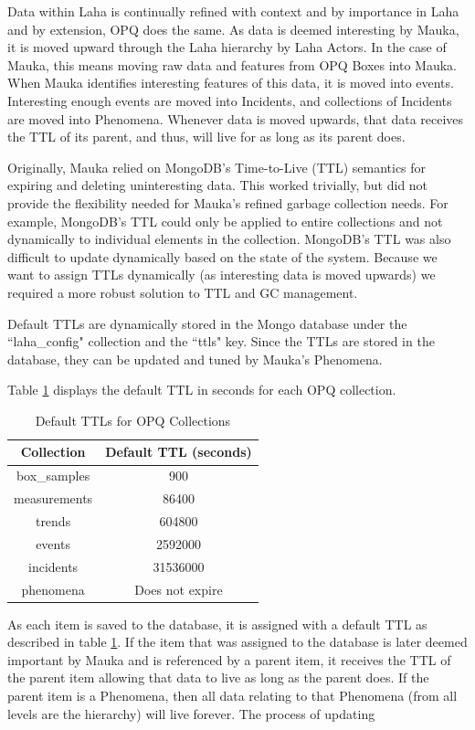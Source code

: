 Data within Laha is continually refined with context and by importance in Laha and by extension, OPQ does the same. As data is deemed interesting by Mauka, it is moved upward through the Laha hierarchy by Laha Actors. In the case of Mauka, this means moving raw data and features from OPQ Boxes into Mauka. When Mauka identifies interesting features of this data, it is moved into events. Interesting enough events are moved into Incidents, and collections of Incidents are moved into Phenomena. Whenever data is moved upwards, that data receives the TTL of its parent, and thus, will live for as long as its parent does.  

Originally, Mauka relied on MongoDB's Time-to-Live (TTL) semantics for expiring and deleting uninteresting data. This worked trivially, but did not provide the flexibility needed for Mauka's refined garbage collection needs. For example, MongoDB's TTL could only be applied to entire collections and not dynamically to individual elements in the collection. MongoDB's TTL was also difficult to update dynamically based on the state of the system. Because we want to assign TTLs dynamically (as interesting data is moved upwards) we required a more robust solution to TTL and GC management.

Default TTLs are dynamically stored in the Mongo database under the ``laha\_config" collection and the ``ttls" key. Since the TTLs are stored in the database, they can be updated and tuned by Mauka's Phenomena.

Table \ref{table:DefaultTtls} displays the default TTL in seconds for each OPQ collection.

\begin{table}[H]
	\centering
	\caption{Default TTLs for OPQ Collections}
	\begin{tabular}{|c|c|}
		\hline 
		Collection & Default TTL (seconds) \\ 
		\hline
		box\_samples & 900 \\
		\hline
		measurements & 86400 \\
		\hline
		trends & 604800 \\
		\hline
		events & 2592000 \\
		\hline
		incidents & 31536000 \\
		\hline 
		phenomena & Does not expire \\
		\hline
	\end{tabular} 
	\label{table:DefaultTtls}
\end{table}

As each item is saved to the database, it is assigned with a default TTL as described in table \ref{table:DefaultTtls}. If the item that was assigned to the database is later deemed important by Mauka and is referenced by a parent item, it receives the TTL of the parent item allowing that data to live as long as the parent does. If the parent item is a Phenomena, then all data relating to that Phenomena (from all levels are the hierarchy) will live forever. The process of updating

